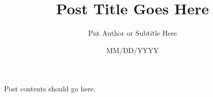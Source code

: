 \documentclass{article}
\title{Post Title Goes Here}
\author{Put Author or Subtitle Here}
\date{MM/DD/YYYY}
\begin{document}
\maketitle

Post contents should go here.
\end{document}
